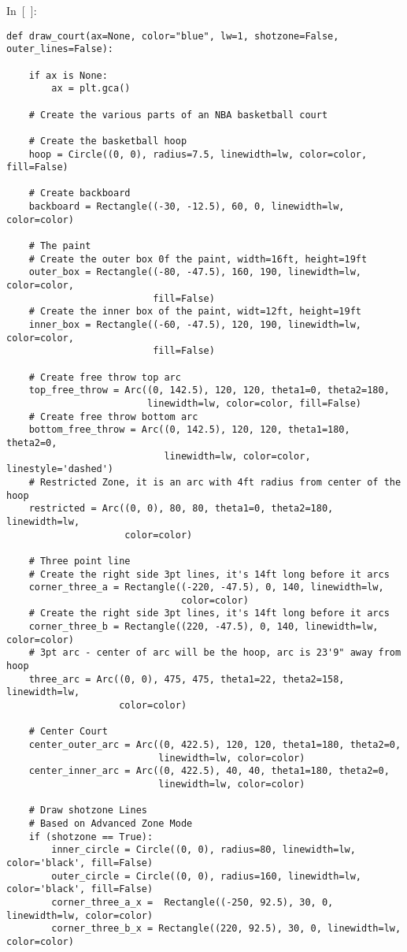 In~{[}~{]}:

\begin{verbatim}
def draw_court(ax=None, color="blue", lw=1, shotzone=False, outer_lines=False):

    if ax is None:
        ax = plt.gca()

    # Create the various parts of an NBA basketball court

    # Create the basketball hoop
    hoop = Circle((0, 0), radius=7.5, linewidth=lw, color=color, fill=False)

    # Create backboard
    backboard = Rectangle((-30, -12.5), 60, 0, linewidth=lw, color=color)

    # The paint
    # Create the outer box 0f the paint, width=16ft, height=19ft
    outer_box = Rectangle((-80, -47.5), 160, 190, linewidth=lw, color=color,
                          fill=False)
    # Create the inner box of the paint, widt=12ft, height=19ft
    inner_box = Rectangle((-60, -47.5), 120, 190, linewidth=lw, color=color,
                          fill=False)

    # Create free throw top arc
    top_free_throw = Arc((0, 142.5), 120, 120, theta1=0, theta2=180,
                         linewidth=lw, color=color, fill=False)
    # Create free throw bottom arc
    bottom_free_throw = Arc((0, 142.5), 120, 120, theta1=180, theta2=0,
                            linewidth=lw, color=color, linestyle='dashed')
    # Restricted Zone, it is an arc with 4ft radius from center of the hoop
    restricted = Arc((0, 0), 80, 80, theta1=0, theta2=180, linewidth=lw,
                     color=color)

    # Three point line
    # Create the right side 3pt lines, it's 14ft long before it arcs
    corner_three_a = Rectangle((-220, -47.5), 0, 140, linewidth=lw,
                               color=color)
    # Create the right side 3pt lines, it's 14ft long before it arcs
    corner_three_b = Rectangle((220, -47.5), 0, 140, linewidth=lw, color=color)
    # 3pt arc - center of arc will be the hoop, arc is 23'9" away from hoop
    three_arc = Arc((0, 0), 475, 475, theta1=22, theta2=158, linewidth=lw,
                    color=color)

    # Center Court
    center_outer_arc = Arc((0, 422.5), 120, 120, theta1=180, theta2=0,
                           linewidth=lw, color=color)
    center_inner_arc = Arc((0, 422.5), 40, 40, theta1=180, theta2=0,
                           linewidth=lw, color=color)
    
    # Draw shotzone Lines
    # Based on Advanced Zone Mode
    if (shotzone == True):
        inner_circle = Circle((0, 0), radius=80, linewidth=lw, color='black', fill=False)
        outer_circle = Circle((0, 0), radius=160, linewidth=lw, color='black', fill=False)
        corner_three_a_x =  Rectangle((-250, 92.5), 30, 0, linewidth=lw, color=color)
        corner_three_b_x = Rectangle((220, 92.5), 30, 0, linewidth=lw, color=color)
        

\end{verbatim}
